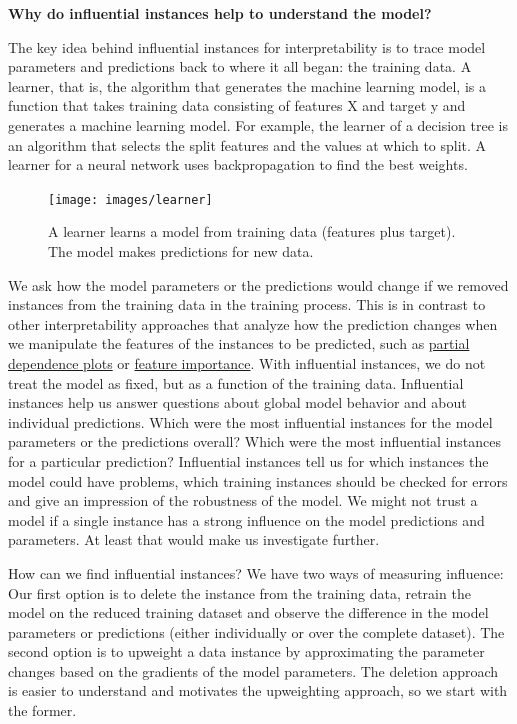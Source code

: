 \documentclass[
  11pt,
]{scrbook}
\begin{document}
\textbf{Why do influential instances help to understand the model?}

The key idea behind influential instances for interpretability is to trace model parameters and predictions back to where it all began: the training data.
A learner, that is, the algorithm that generates the machine learning model, is a function that takes training data consisting of features X and target y and generates a machine learning model.
For example, the learner of a decision tree is an algorithm that selects the split features and the values at which to split.
A learner for a neural network uses backpropagation to find the best weights.

\begin{figure}

{\centering \texttt{[image: images/learner]} 

}

\caption{A learner learns a model from training data (features plus target). The model makes predictions for new data.}\label{fig:learner}
\end{figure}

We ask how the model parameters or the predictions would change if we removed instances from the training data in the training process.
This is in contrast to other interpretability approaches that analyze how the prediction changes when we manipulate the features of the instances to be predicted, such as \protect\hyperlink{pdp}{partial dependence plots} or \protect\hyperlink{feature-importance}{feature importance}.
With influential instances, we do not treat the model as fixed, but as a function of the training data.
Influential instances help us answer questions about global model behavior and about individual predictions.
Which were the most influential instances for the model parameters or the predictions overall?
Which were the most influential instances for a particular prediction?
Influential instances tell us for which instances the model could have problems, which training instances should be checked for errors and give an impression of the robustness of the model.
We might not trust a model if a single instance has a strong influence on the model predictions and parameters.
At least that would make us investigate further.

How can we find influential instances?
We have two ways of measuring influence:
Our first option is to delete the instance from the training data, retrain the model on the reduced training dataset and observe the difference in the model parameters or predictions (either individually or over the complete dataset).
The second option is to upweight a data instance by approximating the parameter changes based on the gradients of the model parameters.
The deletion approach is easier to understand and motivates the upweighting approach, so we start with the former.
\end{document}
